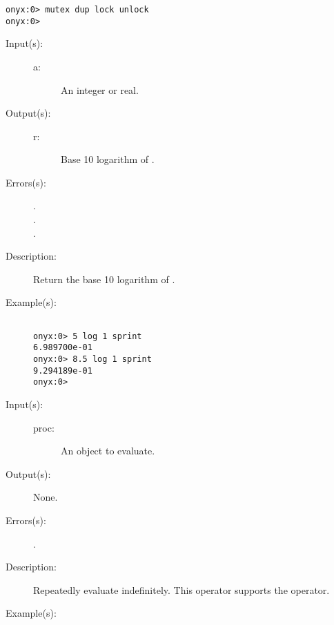 \begin{description}
\begin{description}
\begin{verbatim}
onyx:0> mutex dup lock unlock
onyx:0>
		\end{verbatim}
	\end{description}
\label{systemdict:log}
\item[{\onyxop{a}{log}{r}}: ]
	\begin{description}\item[]
	\item[Input(s): ]
		\begin{description}\item[]
		\item[a: ]
			An integer or real.
		\end{description}
	\item[Output(s): ]
		\begin{description}\item[]
		\item[r: ]
			Base 10 logarithm of .
		\end{description}
	\item[Errors(s): ]
		\begin{description}\item[]
		\item[.]
		\item[.]
		\item[.]
		\end{description}
	\item[Description: ]
		Return the base 10 logarithm of .
	\item[Example(s): ]\begin{verbatim}

onyx:0> 5 log 1 sprint
6.989700e-01
onyx:0> 8.5 log 1 sprint
9.294189e-01
onyx:0>
		\end{verbatim}
	\end{description}
\label{systemdict:loop}
\item[{\onyxop{proc}{loop}{--}}: ]
	\begin{description}\item[]
	\item[Input(s): ]
		\begin{description}\item[]
		\item[proc: ]
			An object to evaluate.
		\end{description}
	\item[Output(s): ] None.
	\item[Errors(s): ]
		\begin{description}\item[]
		\item[.]
		\end{description}
	\item[Description: ]
		Repeatedly evaluate  indefinitely.  This operator
		supports the 
		operator.
	\item[Example(s): ]\begin{verbatim}


\end{verbatim}
\end{description}
\end{description}
